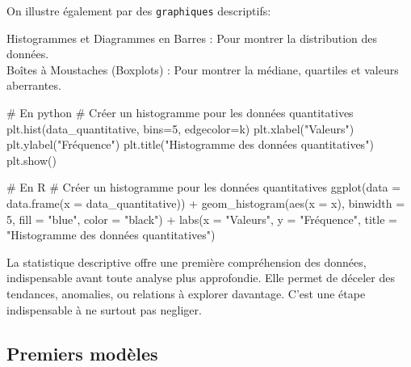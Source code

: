 \documentclass[
  letterpaper,
  DIV=11,
  numbers=noendperiod]{scrartcl}
\newenvironment{Shaded}{\begin{snugshade}}{\end{snugshade}}
\newcommand{\AttributeTok}[1]{\textcolor[rgb]{0.40,0.45,0.13}{#1}}
\newcommand{\CommentTok}[1]{\textcolor[rgb]{0.37,0.37,0.37}{#1}}
\newcommand{\DecValTok}[1]{\textcolor[rgb]{0.68,0.00,0.00}{#1}}
\newcommand{\FunctionTok}[1]{\textcolor[rgb]{0.28,0.35,0.67}{#1}}
\newcommand{\NormalTok}[1]{\textcolor[rgb]{0.00,0.23,0.31}{#1}}
\newcommand{\SpecialCharTok}[1]{\textcolor[rgb]{0.37,0.37,0.37}{#1}}
\newcommand{\StringTok}[1]{\textcolor[rgb]{0.13,0.47,0.30}{#1}}
\begin{document}
On illustre également par des \texttt{graphiques} descriptifs:

Histogrammes et Diagrammes en Barres : Pour montrer la distribution des
données.\\
Boîtes à Moustaches (Boxplots) : Pour montrer la médiane, quartiles et
valeurs aberrantes.

\begin{Shaded}
\begin{Highlighting}[]
\CommentTok{\# En python}
\CommentTok{\# Créer un histogramme pour les données quantitatives}
\FunctionTok{plt.hist}\NormalTok{(data\_quantitative, }\AttributeTok{bins=}\DecValTok{5}\NormalTok{, }\AttributeTok{edgecolor=}\StringTok{\textquotesingle{}k\textquotesingle{}}\NormalTok{)}
\FunctionTok{plt.xlabel}\NormalTok{(}\StringTok{"Valeurs"}\NormalTok{)}
\FunctionTok{plt.ylabel}\NormalTok{(}\StringTok{"Fréquence"}\NormalTok{)}
\FunctionTok{plt.title}\NormalTok{(}\StringTok{"Histogramme des données quantitatives"}\NormalTok{)}
\FunctionTok{plt.show}\NormalTok{()}
\end{Highlighting}
\end{Shaded}

\begin{Shaded}
\begin{Highlighting}[]
\CommentTok{\# En R }
\CommentTok{\# Créer un histogramme pour les données quantitatives}
\FunctionTok{ggplot}\NormalTok{(}\AttributeTok{data =} \FunctionTok{data.frame}\NormalTok{(}\AttributeTok{x =}\NormalTok{ data\_quantitative)) }\SpecialCharTok{+}
  \FunctionTok{geom\_histogram}\NormalTok{(}\FunctionTok{aes}\NormalTok{(}\AttributeTok{x =}\NormalTok{ x), }\AttributeTok{binwidth =} \DecValTok{5}\NormalTok{, }\AttributeTok{fill =} \StringTok{"blue"}\NormalTok{, }\AttributeTok{color =} \StringTok{"black"}\NormalTok{) }\SpecialCharTok{+}
  \FunctionTok{labs}\NormalTok{(}\AttributeTok{x =} \StringTok{"Valeurs"}\NormalTok{, }\AttributeTok{y =} \StringTok{"Fréquence"}\NormalTok{, }\AttributeTok{title =} \StringTok{"Histogramme des données quantitatives"}\NormalTok{)}
\end{Highlighting}
\end{Shaded}

La statistique descriptive offre une première compréhension des données,
indispensable avant toute analyse plus approfondie. Elle permet de
déceler des tendances, anomalies, ou relations à explorer davantage.
C'est une étape indispensable à ne surtout pas negliger.

\subsection{Premiers modèles}\label{premiers-moduxe8les}
\end{document}
